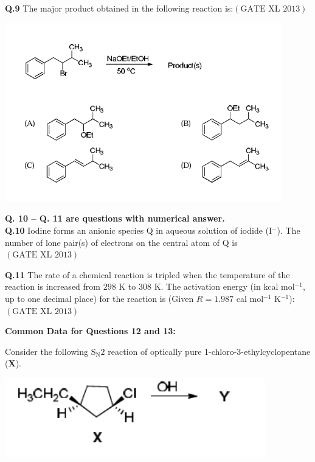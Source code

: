 \documentclass[12pt]{article}
\theoremstyle{remark}
\providecommand{\brak}[1]{\ensuremath{\left(#1\right)}}
\begin{document}
\textbf{Q.9} The major product obtained in the following reaction is:\hfill $\brak{\text{GATE XL 2013}}$
\begin{center}
    \includegraphics[width=0.9\textwidth]{figs/xl 2013 que 9 ch.png}
\end{center}

\noindent\textbf{Q. 10 – Q. 11 are questions with numerical answer.}\\

\textbf{Q.10} Iodine forms an anionic species Q in aqueous solution of iodide (I$^-$). The number of lone pair(s) of electrons on the central atom of Q is \underline{\hspace{2cm}}\hfill $\brak{\text{GATE XL 2013}}$

\textbf{Q.11} The rate of a chemical reaction is tripled when the temperature of the reaction is increased from $298$ K to $308$ K. The activation energy (in kcal mol$^{-1}$, up to one decimal place) for the reaction is (Given $R = 1.987$ cal mol$^{-1}$ K$^{-1}$): \underline{\hspace{2cm}}\hfill $\brak{\text{GATE XL 2013}}$

\noindent\textbf{Common Data for Questions 12 and 13:}

Consider the following S$_\text{N}2$ reaction of optically pure 1-chloro-3-ethylcyclopentane (\textbf{X}).
\begin{center}
    \includegraphics[width=0.85\textwidth]{figs/Screenshot 2025-08-05 114836.png}
\end{center}
\end{document}
